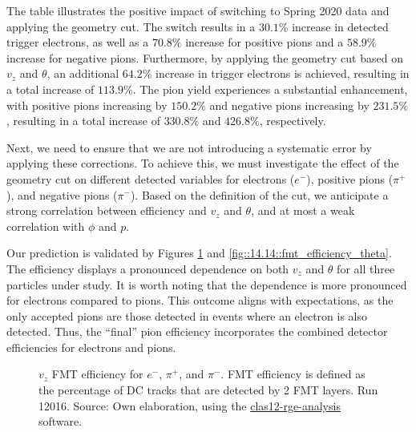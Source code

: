     The table illustrates the positive impact of switching to Spring 2020 data and applying the geometry cut.
    The switch results in a $30.1\%$ increase in detected trigger electrons, as well as a $70.8\%$ increase for positive pions and a $58.9\%$ increase for negative pions.
    Furthermore, by applying the geometry cut based on $v_z$ and $\theta$, an additional $64.2\%$ increase in trigger electrons is achieved, resulting in a total increase of $113.9\%$.
    The pion yield experiences a substantial enhancement, with positive pions increasing by $150.2\%$ and negative pions increasing by $231.5\%$, resulting in a total increase of $330.8\%$ and $426.8\%$, respectively.

    Next, we need to ensure that we are not introducing a systematic error by applying these corrections.
    To achieve this, we must investigate the effect of the geometry cut on different detected variables for electrons ($e^-$), positive pions ($\pi^+$), and negative pions ($\pi^-$).
    Based on the definition of the cut, we anticipate a strong correlation between efficiency and $v_z$ and $\theta$, and at most a weak correlation with $\phi$ and $p$.

    Our prediction is validated by Figures \ref{fig::14.14::fmt_efficiency_vz} and \ref{fig::14.14::fmt_efficiency_theta}.
    The efficiency displays a pronounced dependence on both $v_z$ and $\theta$ for all three particles under study.
    It is worth noting that the dependence is more pronounced for electrons compared to pions.
    This outcome aligns with expectations, as the only accepted pions are those detected in events where an electron is also detected.
    Thus, the ``final'' pion efficiency incorporates the combined detector efficiencies for electrons and pions.

    \begin{figure}[t!]
        \centering{}
        \caption[$v_z$ FMT efficiency for $e^-$, $\pi^+$, and $\pi^-$.
        Run 12016]{$v_z$ FMT efficiency for $e^-$, $\pi^+$, and $\pi^-$.
        FMT efficiency is defined as the percentage of DC tracks that are detected by 2 FMT layers.
        Run 12016.
        Source: Own elaboration, using the \href{https://github.com/bleaktwig/clas12-rge-analysis}{clas12-rge-analysis} software.}
        \label{fig::14.14::fmt_efficiency_vz}
    \end{figure}


